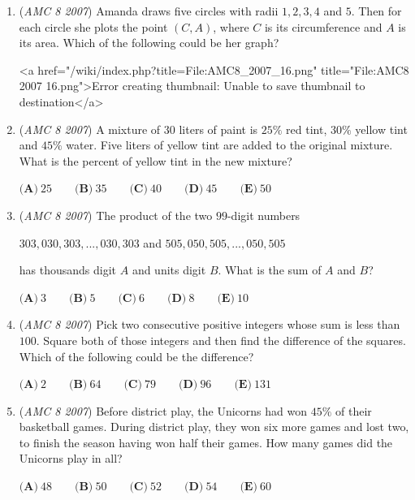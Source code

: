 \begin{enumerate}
 $\textbf{(A)} \ a + c < b  \qquad \textbf{(B)} \ a \cdot b < c \qquad \textbf{(C)} \ a + b < c \qquad \textbf{(D)} \ a \cdot c < b \qquad \textbf{(E)}\frac{b}{c} = a$


	\item (\textit{AMC 8 2007}) Amanda draws five circles with radii $1, 2, 3, 4$ and $5$. Then for each circle she plots the point $(C,A)$,
where $C$ is its circumference and $A$ is its area. Which of the
following could be her graph?


 <a href="/wiki/index.php?title=File:AMC8\_2007\_16.png" title="File:AMC8 2007 16.png">Error creating thumbnail: Unable to save thumbnail to destination</a>


	\item (\textit{AMC 8 2007}) A mixture of $30$ liters of paint is $25\%$ red tint, $30\%$ yellow
tint and $45\%$ water. Five liters of yellow tint are added to
the original mixture. What is the percent of yellow tint
in the new mixture?


 $\textbf{(A)}\ 25 \qquad \textbf{(B)}\ 35 \qquad \textbf{(C)}\ 40 \qquad \textbf{(D)}\ 45 \qquad \textbf{(E)}\ 50$


	\item (\textit{AMC 8 2007}) The product of the two $99$-digit numbers


 $303,\!030,\!303,\!...,\!030,\!303$ and $505,\!050,\!505,\!...,\!050,\!505$


 has thousands digit $A$ and units digit $B$. What is the sum of $A$ and $B$?


 $\textbf{(A)}\ 3 \qquad \textbf{(B)}\ 5 \qquad \textbf{(C)}\ 6 \qquad \textbf{(D)}\ 8 \qquad \textbf{(E)}\ 10$


	\item (\textit{AMC 8 2007}) Pick two consecutive positive integers whose sum is less than $100$. Square both
of those integers and then find the difference of the squares. Which of the
following could be the difference?


 $\textbf{(A)}\ 2 \qquad \textbf{(B)}\ 64 \qquad \textbf{(C)}\ 79 \qquad \textbf{(D)}\ 96 \qquad \textbf{(E)}\ 131$


	\item (\textit{AMC 8 2007}) Before district play, the Unicorns had won $45\%$ of their
basketball games. During district play, they won six more
games and lost two, to finish the season having won half
their games. How many games did the Unicorns play in
all?


 $\textbf{(A)}\ 48 \qquad \textbf{(B)}\ 50 \qquad \textbf{(C)}\ 52 \qquad \textbf{(D)}\ 54 \qquad \textbf{(E)}\ 60$



\end{enumerate}
